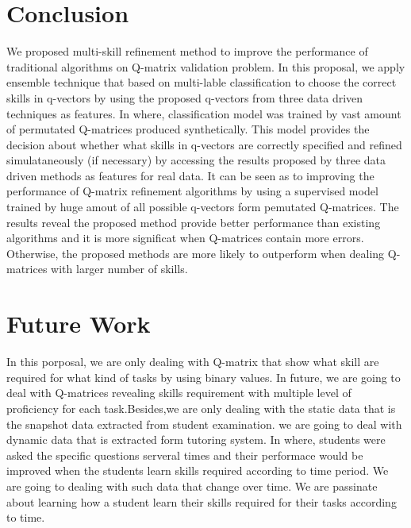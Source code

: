 \documentclass[11pt]{article}
\begin{document}
\section{Conclusion}
We proposed multi-skill refinement method to improve the performance of traditional  algorithms on Q-matrix validation problem. In this proposal, we apply ensemble technique that based on multi-lable classification to choose the correct skills in q-vectors by using the proposed q-vectors from three data driven techniques as features. In where, classification model was trained by vast amount of permutated Q-matrices produced synthetically. This model provides the decision about whether what skills in q-vectors are correctly specified and refined simulataneously (if necessary)  by accessing the results proposed by three data driven methods as features for real data. It can be seen as to improving the performance of Q-matrix refinement algorithms by using a supervised model trained by huge amout of all possible q-vectors form pemutated Q-matrices. The results reveal the proposed method provide better performance than existing algorithms and it is more significat when Q-matrices contain more errors. Otherwise, the proposed methods are more likely to outperform when dealing Q-matrices with larger number of skills.  


\section{Future Work}

In this porposal, we are only dealing with Q-matrix that show what skill are required for what kind of tasks by using binary values. In future, we are going to deal with Q-matrices revealing skills requirement with multiple level of proficiency  for each task.Besides,we are only dealing with the static data that is the snapshot data extracted from student examination. we are going to deal with dynamic data that is extracted form tutoring system. In where, students were asked the specific questions serveral times and their performace would be improved when the students learn skills required according to time period. We are going to dealing with such data that change over time. We are passinate about learning how a student learn their skills required for their tasks according to time.  



\end{document}
